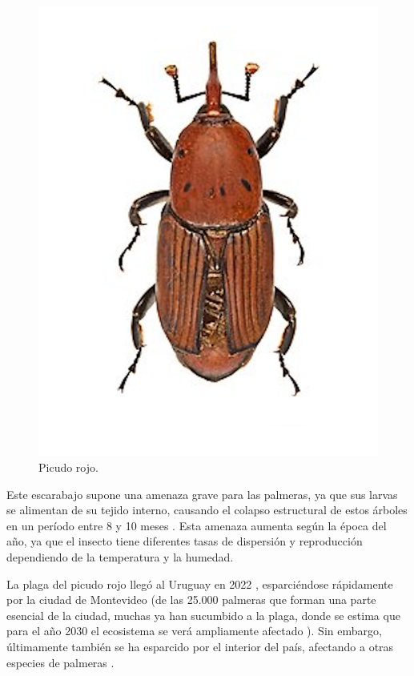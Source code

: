 \begin{figure}[htpb]
  \centering
  \includegraphics[scale=1]{./Figures/picudo-rojo.png}
  \caption{Picudo rojo\protect\footnotemark.}
  \label{fig:picudo-rojo}
\end{figure}


Este escarabajo supone una amenaza grave para las palmeras, ya que sus larvas se alimentan de su tejido interno, causando el colapso estructural de estos árboles en un período entre 8 y 10 meses . Esta amenaza aumenta según la época del año, ya que el insecto tiene diferentes tasas de dispersión y reproducción dependiendo de la temperatura y la humedad.

La plaga del picudo rojo llegó al Uruguay en 2022 , esparciéndose rápidamente por la ciudad de Montevideo (de las 25.000 palmeras que forman una parte esencial de la ciudad, muchas ya han sucumbido a la plaga, donde se estima que para el año 2030 el ecosistema se verá ampliamente afectado ). Sin embargo, últimamente también se ha esparcido por el interior del país, afectando a otras especies de palmeras .

